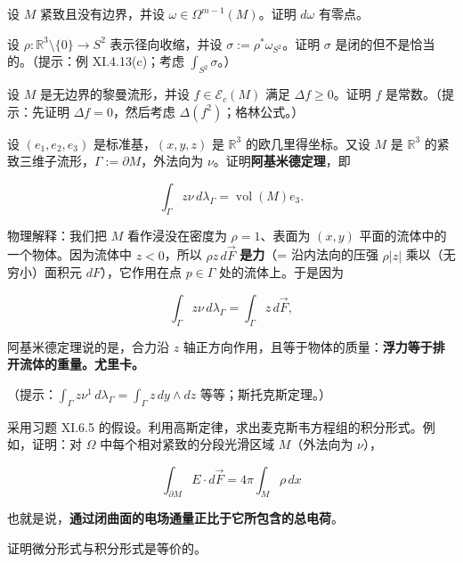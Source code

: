 \begin{exercises}
\item

设 $ M $ 紧致且没有边界，并设 $ \omega \in \Omega^{m-1}(M) $。证明 $ d\omega $ 有零点。

\item

设 $ \rho: \mathbb{R}^3\setminus\{0\} \to S^2 $ 表示径向收缩，并设 $ \sigma := \rho^*\omega_{S^2} $。证明 $ \sigma $ 是闭的但不是恰当的。（提示：例 XI.4.13(c)；考虑 $ \int_{S^2}\sigma $。）

\item

设 $ M $ 是无边界的黎曼流形，并设 $ f \in \mathcal{E}_c(M) $ 满足 $ \Delta f \ge 0 $。证明 $ f $ 是常数。（提示：先证明 $ \Delta f = 0 $，然后考虑 $ \Delta(f^2) $；格林公式。）

\item

设 $ (e_1,e_2,e_3) $ 是标准基，$ (x,y,z) $ 是 $ \mathbb{R}^3 $ 的欧几里得坐标。又设 $ M $ 是 $ \mathbb{R}^3 $ 的紧致三维子流形，$ \Gamma := \partial M $，外法向为 $ \nu $。证明\textbf{阿基米德定理}，即

\[
\int_\Gamma z\nu\,d\lambda_\Gamma = \operatorname{vol}(M)e_3.
\]

物理解释：我们把 $ M $ 看作浸没在密度为 $ \rho = 1 $、表面为 $ (x,y) $ 平面的流体中的一个物体。因为流体中 $ z < 0 $，所以 $ \rho z\,d\vec{F} $ \textbf{是力}（= 沿内法向的压强 $ \rho|z| $ 乘以（无穷小）面积元 $ dF $），它作用在点 $ p \in \Gamma $ 处的流体上。于是因为

\[
\int_\Gamma z\nu\,d\lambda_\Gamma = \int_\Gamma z\,d\vec{F},
\]

阿基米德定理说的是，合力沿 $ z $ 轴正方向作用，且等于物体的质量：\textbf{浮力等于排开流体的重量。尤里卡。}

（提示：$ \int_\Gamma z\nu^1\,d\lambda_\Gamma = \int_\Gamma z\,dy\wedge dz $ 等等；斯托克斯定理。）

\item

采用习题 XI.6.5 的假设。利用高斯定律，求出麦克斯韦方程组的积分形式。例如，证明：对 $ \Omega $ 中每个相对紧致的分段光滑区域 $ M $（外法向为 $ \nu $），

\[
\int_{\partial M} E\cdot d\vec{F} = 4\pi\int_M \rho\,dx
\]

也就是说，\textbf{通过闭曲面的电场通量正比于它所包含的总电荷}。

证明微分形式与积分形式是等价的。


\end{exercises}
